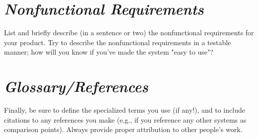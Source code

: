 \documentclass[12pt]{article}
\begin{document}
\section{\emph{Nonfunctional Requirements}}
List and briefly describe (in a sentence or two) the nonfunctional requirements for your product. Try to describe the nonfunctional requirements in a testable manner; how will you know if you've made the system "easy to use"?

\section{\emph{Glossary/References}}
Finally, be sure to define the specialized terms you use (if any!), and to include citations to any references you make (e.g., if you reference any other systems as comparison points). Always provide proper attribution to other people's work.
\end{document}
